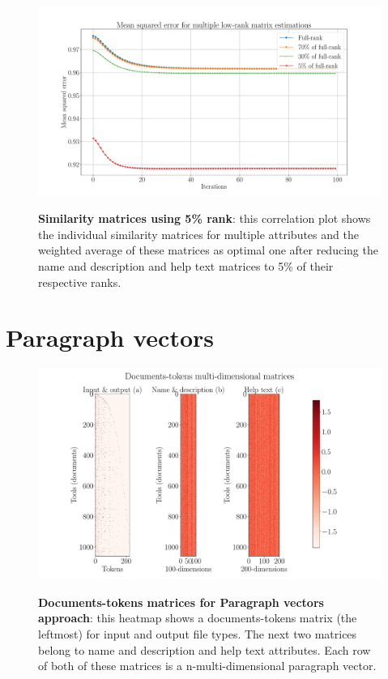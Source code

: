 \begin{figure}[h]
\begin{centering}
    {\includegraphics[scale=0.35]{figures/MSE_iterations_low_rank.pdf}}
    \caption[Similarity matrices 5\% rank]{\textbf{Similarity matrices using 5\% rank}: this correlation plot shows the individual similarity matrices for multiple attributes and the weighted average of these matrices as optimal one after reducing the name and description and help text matrices to 5\% of their respective ranks.}
\end{centering}
\end{figure}

\section{Paragraph vectors}

\begin{figure}[h]
\begin{centering}
    {\includegraphics[scale=0.35]{figures/Documents-tokens_doc2vec.pdf}}
    \caption[Documents-tokens matrices for doc2vec]{\textbf{Documents-tokens matrices for Paragraph vectors approach}: this heatmap shows a documents-tokens matrix (the leftmost) for input and output file types. The next two matrices belong to name and description and help text attributes. Each row of both of these matrices is a n-multi-dimensional paragraph vector.}
\end{centering}
\end{figure}


